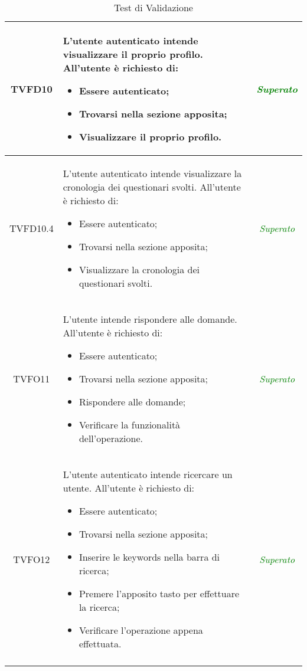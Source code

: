 \begin{longtable}[ht]{|c|>{}m{8cm}|c|}
\hypertarget{TVFD10}{TVFD10} & L’utente autenticato  intende visualizzare il proprio profilo. All’utente è richiesto di:
\begin{itemize}
\item Essere autenticato;
\item Trovarsi nella sezione apposita;
\item Visualizzare il proprio profilo.
\end{itemize} & \textcolor{Green}{\textit{Superato}}\\ \hline
\hypertarget{TVFD10.4}{TVFD10.4} & L’utente autenticato  intende visualizzare la cronologia dei questionari svolti. All’utente è richiesto di:
\begin{itemize}
\item Essere autenticato;
\item Trovarsi nella sezione apposita;
\item Visualizzare la cronologia dei questionari svolti.
\end{itemize} & \textcolor{Green}{\textit{Superato}}\\ \hline
\hypertarget{TVFO11}{TVFO11} & L’utente  intende rispondere alle domande. All’utente è richiesto di:
\begin{itemize}
\item Essere autenticato;
\item Trovarsi nella sezione apposita;
\item Rispondere alle domande;
\item Verificare la funzionalità dell'operazione.
\end{itemize} & \textcolor{Green}{\textit{Superato}}\\ \hline
\hypertarget{TVFO12}{TVFO12} & L’utente autenticato  intende ricercare un utente. All’utente è richiesto di:
\begin{itemize}
\item Essere autenticato;
\item Trovarsi nella sezione apposita;
\item Inserire le keywords nella barra di ricerca;
\item Premere l'apposito tasto per effettuare la ricerca;
\item Verificare l’operazione appena effettuata.
\end{itemize} & \textcolor{Green}{\textit{Superato}}\\ \hline
\caption[Test di Validazione]{Test di Validazione}
\label{tabella:test0}
\end{longtable}
\clearpage
